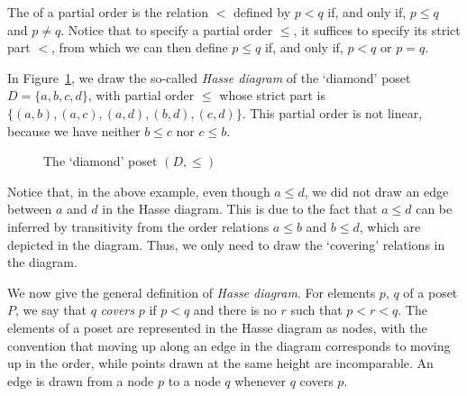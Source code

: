 The  of a partial order is the relation $<$ defined by $p < q$ if, and only if, $p \leq q$ and $p \neq q$. Notice that to specify a partial order $\leq$, it suffices to specify its strict part $<$, from which we can then define $p \leq q$ if, and only if, $p < q$ or $p = q$.

\begin{example}  
  In Figure~\ref{fig:diamond}, we draw the so-called \emph{Hasse diagram} of the `diamond' poset $D = \{a,b,c,d\}$, with partial order ${\leq}$ whose strict part is $\{(a,b),(a,c),(a,d),(b,d),(c,d)\}.$
  This partial order is not linear, because we have neither $b \leq c$ nor $c \leq b$.

  \begin{figure}
  \begin{center}
  \end{center}
  \vspace{-5mm}
  \caption{The `diamond' poset $(D,\leq)$}
  \label{fig:diamond}
  \end{figure}

\end{example}
Notice that, in the above example, even though $a \leq d$, we did not draw an edge between $a$ and $d$ in the Hasse diagram. This is due to the fact that $a \leq d$ can be inferred by transitivity from the order relations $a \leq b$ and $b \leq d$, which are depicted in the diagram. Thus, we only need to draw the `covering' relations in the diagram.

We now give the general definition of \emph{Hasse diagram}. For elements $p$, $q$ of a poset $P$, we say that $q$ \emph{covers} $p$ if $p < q$ and there is no $r$ such that $p < r < q$. The elements of a poset are represented in the Hasse diagram as nodes, with the convention that moving up along an edge in the diagram corresponds to moving up in the order, while points drawn at the same height are incomparable. An edge is drawn from a node $p$ to a node $q$ whenever $q$ covers $p$.

